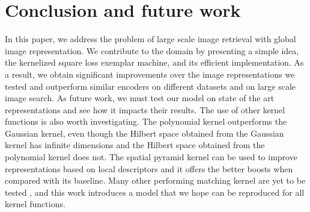 \section{Conclusion and future work}
\label{conclusion}
In this paper, we address the problem of large scale image retrieval with global image representation. 
We contribute to the domain by presenting a simple idea, the kernelized square loss exemplar machine, and its efficient implementation.
As a result, we obtain significant improvements over the image representations we tested and outperform similar encoders on different datasets and on large scale image search. 
As future work, we must test our model on state of the art representations and see how it impacts their results.
The use of other kernel functions is also worth investigating. The polynomial kernel outperforms the Gaussian kernel, even though the Hilbert space obtained from the Gaussian kernel has infinite dimensions and the Hilbert space obtained from the polynomial kernel does not.
The spatial pyramid kernel can be used to improve representations based on local descriptors and it offers the better boosts when compared with its baseline.
Many other performing matching kernel are yet to be tested \cite{Tolias13}, and this work introduces a model that we hope can be reproduced for all kernel functions.

